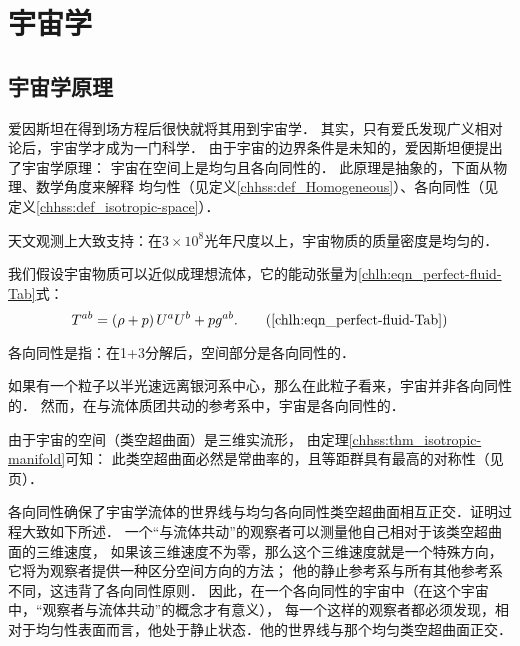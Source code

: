 
\chapter{宇宙学}\label{chcos}

\section{宇宙学原理}\label{chcos:sec_COSP}

爱因斯坦在得到场方程后很快就将其用到宇宙学．
其实，只有爱氏发现广义相对论后，宇宙学才成为一门科学．
由于宇宙的边界条件是未知的，爱因斯坦便提出了{\heiti 宇宙学原理}：
{\kaishu 宇宙在空间上是均匀且各向同性的}．
此原理是抽象的，下面从物理、数学角度来解释
均匀性（见定义\ref{chhss:def_Homogeneous}）、各向同性（见定义\ref{chhss:def_isotropic-space}）．

天文观测上大致支持：在$3\times 10^{8}$光年尺度以上，宇宙物质的质量密度是均匀的．

我们假设宇宙物质可以近似成理想流体，它的能动张量为\eqref{chlh:eqn_perfect-fluid-Tab}式：
\begin{equation}
	T^{ab}=\left(\rho  + p \right) U^a U^b +p g^{ab} .
	\tag{\ref{chlh:eqn_perfect-fluid-Tab}}
\end{equation}

各向同性是指：在1+3分解后，空间部分是各向同性的．

如果有一个粒子以半光速远离银河系中心，那么在此粒子看来，宇宙并非各向同性的．
然而，在与流体质团共动的参考系中，宇宙是各向同性的．

由于宇宙的空间（类空超曲面）是三维实流形，
由定理\ref{chhss:thm_isotropic-manifold}可知：
此类空超曲面必然是常曲率的，且等距群具有最高的对称性（见\pageref{chhss:sec_fh}页）．


{\kaishu 各向同性确保了宇宙学流体的世界线与均匀各向同性类空超曲面相互正交．}证明过程大致如下所述．
一个“与流体共动”的观察者可以测量他自己相对于该类空超曲面的三维速度，
如果该三维速度不为零，那么这个三维速度就是一个特殊方向，它将为观察者提供一种区分空间方向的方法；
他的静止参考系与所有其他参考系不同，这违背了各向同性原则．
因此，在一个各向同性的宇宙中（在这个宇宙中，“观察者与流体共动”的概念才有意义），
每一个这样的观察者都必须发现，相对于均匀性表面而言，他处于静止状态．他的世界线与那个均匀类空超曲面正交．

